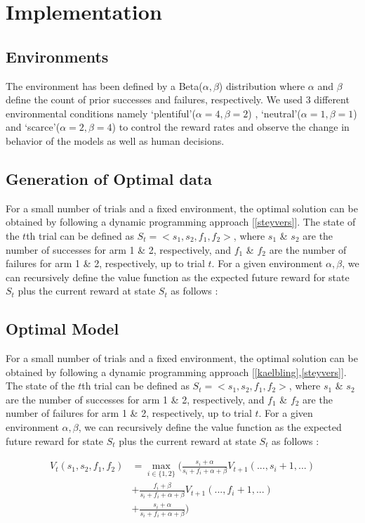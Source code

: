\section{Implementation}

\subsection{Environments}
The environment has been defined by a Beta($\alpha,\beta$) distribution where $\alpha$ and $\beta$ define the count of prior successes and failures, respectively. We used 3 different environmental conditions namely ‘plentiful’($\alpha=4,\beta=2$) , ‘neutral’($\alpha=1,\beta=1$) and ‘scarce’($\alpha=2,\beta=4$) to control the reward rates and observe the change in behavior of the models as well as human decisions.

\subsection{Generation of Optimal data}
For a small number of trials and a fixed environment, the optimal solution can be obtained by following a dynamic programming approach [\ref{steyvers}]. The state of the $t$th trial can be defined as $S_t = <s_1,s_2,f_1,f_2>$, where $s_1$ \& $s_2$ are the number of successes for arm 1 \& 2, respectively, and $f_1$ \& $f_2$ are the number of failures for arm 1 \& 2, respectively, up to trial $t$. For a given environment $\alpha,\beta$, we can recursively define the value function as the expected future reward for state $S_t$ plus the current reward at state $S_t$ as follows : 

\subsection{Optimal Model}
For a small number of trials and a fixed environment, the optimal solution can be obtained by following a dynamic programming approach [\ref{kaelbling},\ref{steyvers}]. The state of the $t$th trial can be defined as $S_t = <s_1,s_2,f_1,f_2>$, where $s_1$ \& $s_2$ are the number of successes for arm 1 \& 2, respectively, and $f_1$ \& $f_2$ are the number of failures for arm 1 \& 2, respectively, up to trial $t$. For a given environment $\alpha,\beta$, we can recursively define the value function as the expected future reward for state $S_t$ plus the current reward at state $S_t$ as follows : 

\begin{align*}
	V_t(s_1,s_2,f_1,f_2) &= \max_{i \in \{1,2\}} 
	\Big(
	\frac{s_i + \alpha}{s_i + f_i + \alpha + \beta} V_{t+1}(...,s_i+1,...) \\
	&+ \frac{f_i + \beta}{s_i + f_i + \alpha + \beta} V_{t+1}(...,f_i+1,...)\\
	&+ \frac{s_i + \alpha}{s_i + f_i + \alpha + \beta} 
	\Big)	
\end{align*}


